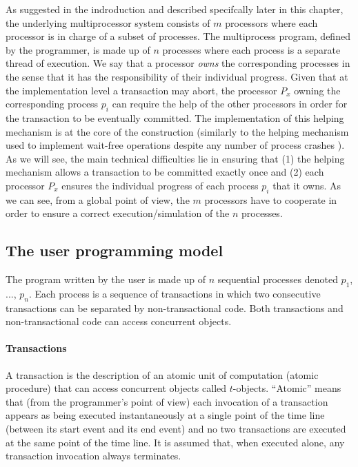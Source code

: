 As suggested in the indroduction and described specifcally later in this chapter,
the underlying multiprocessor system  consists of 
$m$  processors where each processor is in charge  of a  subset of  processes.
The  multiprocess program, defined  by the  programmer, is  made up  of $n$
processes  where each process is a separate thread of execution.
 We say that a processor {\it owns}
the corresponding processes in the sense that  it has the responsibility 
of their individual   progress.  Given that at  the implementation level
a  transaction may abort, the processor $P_x$ owning the corresponding 
process $p_i$ can  require the help of  the other  processors  
in order for the transaction to be eventually committed. 
The  implementation of this  helping mechanism  is at the core of the 
construction  (similarly to the helping mechanism used  to implement 
wait-free operations despite any number of process crashes \cite{H91}). 
As we  will  see, the  main technical difficulties  lie  in   ensuring that 
(1) the helping  mechanism  allows   a transaction to be committed  exactly
once and (2) each processor $P_x$ ensures the individual progress  of  each 
process $p_i$ that it owns. As we can see, from a global point of view,
the  $m$ processors have to    cooperate in order to ensure a correct
execution/simulation of the $n$  processes. 


\subsection{The  user programming model}

The program written by the user is made up of $n$ sequential processes
denoted $p_1$, ..., $p_n$. Each process is a sequence of transactions 
in which two consecutive transactions can be separated by non-transactional 
code. Both transactions and  non-transactional code can access concurrent 
objects.

\paragraph{Transactions}
A transaction is the description of an atomic unit of computation 
(atomic procedure) that can access concurrent objects called $t$-objects. 
``Atomic'' means that (from the programmer's point of view) each 
invocation of a transaction appears as being executed 
instantaneously at a single point of  the time line (between its start event
and its end event) and no two transactions are executed at the same point 
of the time line.  It is  assumed that, when executed alone, 
any  transaction  invocation always terminates.  

